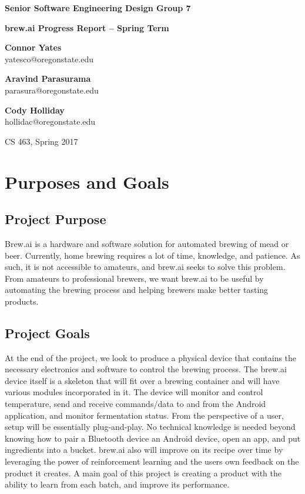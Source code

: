 \documentclass[draftclsnofoot,onecolumn,letterpaper,10pt]{IEEEtran}
\begin{document}
\begin{center}
	{\huge\textbf{Senior Software Engineering Design Group 7}}
	\vspace{1cm}

	{\Huge\textbf{brew.ai Progress Report -- Spring Term}}

	\vspace{2cm}
	\textbf{Connor Yates}\\yatesco@oregonstate.edu

	\textbf{Aravind Parasurama}\\parasura@oregonstate.edu

	\textbf{Cody Holliday}\\hollidac@oregonstate.edu

	\vspace{2cm}
	{\Large CS 463, Spring 2017}
	\vspace{1cm}
\end{center}

\newpage
\tableofcontents
\newpage

\section{Purposes and Goals}
\subsection{Project Purpose}
Brew.ai is a hardware and software solution for automated brewing of mead or beer.
Currently, home brewing requires a lot of time, knowledge, and patience.
As such, it is not accessible to amateurs, and brew.ai seeks to solve this problem.
From amateurs to professional brewers, we want brew.ai to be useful by automating the brewing process and helping brewers make better tasting products.

\subsection{Project Goals}
At the end of the project, we look to produce a physical device that contains the necessary electronics and software to control the brewing process.
The brew.ai device itself is a skeleton that will fit over a brewing container and will have various modules incorporated in it.
The device will monitor and control temperature, send and receive commands/data to and from the Android application, and monitor fermentation status.
From the perspective of a user, setup will be essentially plug-and-play.
No technical knowledge is needed beyond knowing how to pair a Bluetooth device an Android device, open an app, and put ingredients into a bucket.
brew.ai also will improve on its recipe over time by leveraging the power of reinforcement learning and the users own feedback on the product it creates.
A main goal of this project is creating a product with the ability to learn from each batch, and improve its performance.
\end{document}
